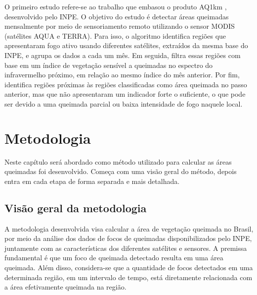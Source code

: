 \documentclass[cic,tc]{iiufrgs}
\begin{document}
O primeiro estudo refere-se ao trabalho que embasou o produto AQ1km \citep{libonati2015algorithm}, desenvolvido pelo INPE. O objetivo do estudo é detectar áreas queimadas mensalmente por meio de sensoriamento remoto utilizando o sensor MODIS (satélites AQUA e TERRA). Para isso, o algoritmo identifica regiões que apresentaram fogo ativo usando diferentes satélites, extraídos da mesma base do INPE, e agrupa os dados a cada um mês. Em seguida, filtra essas regiões com base em um índice de vegetação sensível a queimadas no espectro do infravermelho próximo, em relação ao mesmo índice do mês anterior. Por fim, identifica regiões próximas às regiões classificadas como área queimada no passo anterior, mas que não apresentaram um indicador forte o suficiente, o que pode ser devido a uma queimada parcial ou baixa intensidade de fogo naquele local. \par





\chapter{Metodologia}

Neste capítulo será abordado como método utilizado para calcular as áreas queimadas foi desenvolvido. Começa com uma visão geral do método, depois entra em cada etapa de forma separada e mais detalhada.

\section{Visão geral da metodologia}

A metodologia desenvolvida visa calcular a área de vegetação queimada no Brasil, por meio da análise dos dados de focos de queimadas disponibilizados pelo INPE, juntamente com as características dos diferentes satélites e sensores. A premissa fundamental é que um foco de queimada detectado resulta em uma área queimada. Além disso, considera-se que a quantidade de focos detectados em uma determinada região, em um intervalo de tempo, está diretamente relacionada com a área efetivamente queimada na região. \par 
\end{document}
